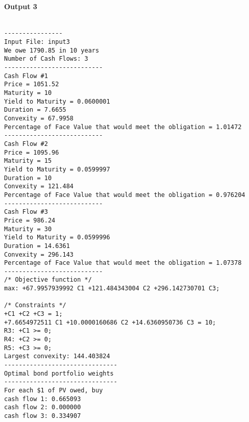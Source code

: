 \documentclass[12pt]{article}
\begin{document}
\paragraph{Output 3}

\begin{verbatim}

----------------
Input File: input3
We owe 1790.85 in 10 years
Number of Cash Flows: 3
---------------------------
Cash Flow #1
Price = 1051.52
Maturity = 10
Yield to Maturity = 0.0600001
Duration = 7.6655
Convexity = 67.9958
Percentage of Face Value that would meet the obligation = 1.01472
---------------------------
Cash Flow #2
Price = 1095.96
Maturity = 15
Yield to Maturity = 0.0599997
Duration = 10
Convexity = 121.484
Percentage of Face Value that would meet the obligation = 0.976204
---------------------------
Cash Flow #3
Price = 986.24
Maturity = 30
Yield to Maturity = 0.0599996
Duration = 14.6361
Convexity = 296.143
Percentage of Face Value that would meet the obligation = 1.07378
---------------------------
/* Objective function */
max: +67.9957939992 C1 +121.484343004 C2 +296.142730701 C3;

/* Constraints */
+C1 +C2 +C3 = 1;
+7.6654972511 C1 +10.0000160686 C2 +14.6360950736 C3 = 10;
R3: +C1 >= 0;
R4: +C2 >= 0;
R5: +C3 >= 0;
Largest convexity: 144.403824
-------------------------------
Optimal bond portfolio weights
-------------------------------
For each $1 of PV owed, buy
cash flow 1: 0.665093
cash flow 2: 0.000000
cash flow 3: 0.334907

\end{verbatim}
\end{document}
